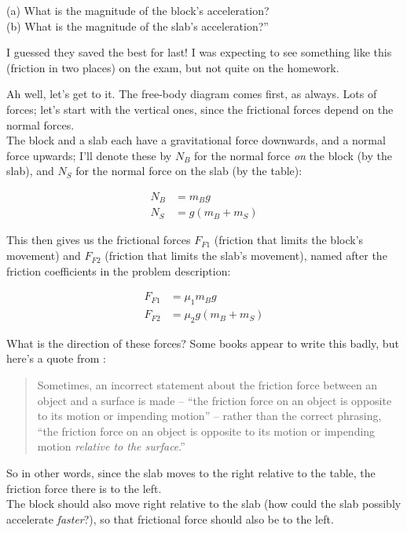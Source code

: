 \documentclass[8.01x]{subfiles}
\begin{document}
(a) What is the magnitude of the block's acceleration?\\
(b) What is the magnitude of the slab's acceleration?''

I guessed they saved the best for last! I was expecting to see something like this (friction in two places) on the exam, but not quite on the homework.

Ah well, let's get to it. The free-body diagram comes first, as always. Lots of forces; let's start with the vertical ones, since the frictional forces depend on the normal forces.\\
The block and a slab each have a gravitational force downwards, and a normal force upwards; I'll denote these by $N_B$ for the normal force \emph{on} the block (by the slab), and $N_S$ for the normal force on the slab (by the table):

\begin{align}
N_B &= m_B g\\
N_S &= g(m_B + m_S)
\end{align}

This then gives us the frictional forces $F_{F1}$ (friction that limits the block's movement) and $F_{F2}$ (friction that limits the slab's movement), named after the friction coefficients in the problem description:

\begin{align}
F_{F1} &= \mu_1 m_B g\\
F_{F2} &= \mu_2 g(m_B + m_S)
\end{align}

What is the direction of these forces? Some books appear to write this badly, but here's a quote from \cite[p.~123]{serway}:

\begin{quote}
Sometimes, an incorrect statement about the friction force between an object and a surface is made -- ``the friction force on an object is opposite to its motion or impending motion'' -- rather than the correct phrasing, ``the friction force on an object is opposite to its motion or impending motion \emph{relative to the surface}.''
\end{quote}

So in other words, since the slab moves to the right relative to the table, the friction force there is to the left.\\
The block should also move right relative to the slab (how could the slab possibly accelerate \emph{faster}?), so that frictional force should also be to the left.
\end{document}
